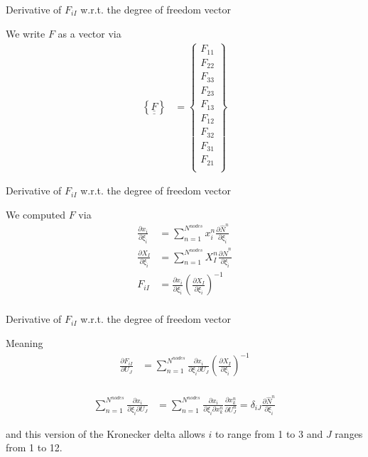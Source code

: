 \documentclass[11pt]{beamer}
\newcommand{\TEN}[1]{\underline{\underline{#1}}}
\begin{document}
\begin{frame}{Derivative of $F_{iI}$ w.r.t. the degree of freedom vector}

We write $F$ as a vector via
\begin{align*}
\left\{\TEN{F}\right\} &= \left\{\begin{array}{c}
F_{11}\\
F_{22}\\
F_{33}\\
F_{23}\\
F_{13}\\
F_{12}\\
F_{32}\\
F_{31}\\
F_{21}\\
\end{array}\right\}
\end{align*}

\end{frame}

\begin{frame}{Derivative of $F_{iI}$ w.r.t. the degree of freedom vector}

We computed $F$ via
\begin{align*}
\frac{\partial x_i}{\partial \xi_{\hat{i}}} &= \sum_{n=1}^{N^{nodes}}x_i^n\frac{\partial \hat{N}^n}{\partial \xi_{\hat{i}}}\\
\frac{\partial X_I}{\partial \xi_{\hat{i}}} &= \sum_{n=1}^{N^{nodes}}X_I^n\frac{\partial \hat{N}^n}{\partial \xi_{\hat{i}}}\\
F_{iI} &= \frac{\partial x_i}{\partial \xi_{\hat{i}}} \left(\frac{\partial X_I}{\partial \xi_{\hat{i}}}\right)^{-1}\\
\end{align*}

\end{frame}

\begin{frame}{Derivative of $F_{iI}$ w.r.t. the degree of freedom vector}

Meaning
\begin{align*}
\frac{\partial F_{iI}}{\partial U_J} &= \sum_{n=1}^{N^{nodes}}\frac{\partial x_i}{\partial \xi_{\hat{i}} \partial U_J} \left(\frac{\partial X_I}{\partial \xi_{\hat{i}}}\right)^{-1}\\
\end{align*}

\begin{align*}
\sum_{n=1}^{N^{nodes}}\frac{\partial x_i}{\partial \xi_{\hat{i}} \partial U_J} &= \sum_{n=1}^{N^{nodes}}\frac{\partial x_i}{\partial \xi_{\hat{i}} \partial x_k^n}\frac{\partial x_k^n}{\partial U_J^n} = \delta_{iJ} \frac{\partial \hat{N}^n}{\partial \xi_{\hat{i}}}
\end{align*}

and this version of the Kronecker delta allows $i$ to range from 1 to 3 and $J$ ranges from 1 to 12.

\end{frame}
\end{document}
